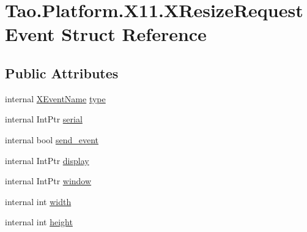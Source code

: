 \hypertarget{struct_tao_1_1_platform_1_1_x11_1_1_x_resize_request_event}{
\section{Tao.Platform.X11.XResizeRequestEvent Struct Reference}
\label{struct_tao_1_1_platform_1_1_x11_1_1_x_resize_request_event}
}
\subsection*{Public Attributes}
\begin{DoxyCompactItemize}
\item 
internal \hyperlink{namespace_tao_1_1_platform_1_1_x11_aff81ed5b8778e1ea8e872861dff9f146}{XEventName} \hyperlink{struct_tao_1_1_platform_1_1_x11_1_1_x_resize_request_event_a22f8e902e841d8f1121ba983a82e4964}{type}
\item 
internal IntPtr \hyperlink{struct_tao_1_1_platform_1_1_x11_1_1_x_resize_request_event_afdbba02f5fe8e7121d7727a17b541719}{serial}
\item 
internal bool \hyperlink{struct_tao_1_1_platform_1_1_x11_1_1_x_resize_request_event_a790c87cce8caf1a8820fdf6918eed228}{send\_\-event}
\item 
internal IntPtr \hyperlink{struct_tao_1_1_platform_1_1_x11_1_1_x_resize_request_event_a34ead4dbb535f007d618b1a57eab531b}{display}
\item 
internal IntPtr \hyperlink{struct_tao_1_1_platform_1_1_x11_1_1_x_resize_request_event_a4e20de1f70e1a5c1a30e6419c88c7af6}{window}
\item 
internal int \hyperlink{struct_tao_1_1_platform_1_1_x11_1_1_x_resize_request_event_a05652c9373f5c5efca32c6b4cf555985}{width}
\item 
internal int \hyperlink{struct_tao_1_1_platform_1_1_x11_1_1_x_resize_request_event_af263ea7c56f2f5951d54a8321b58df61}{height}
\end{DoxyCompactItemize}


